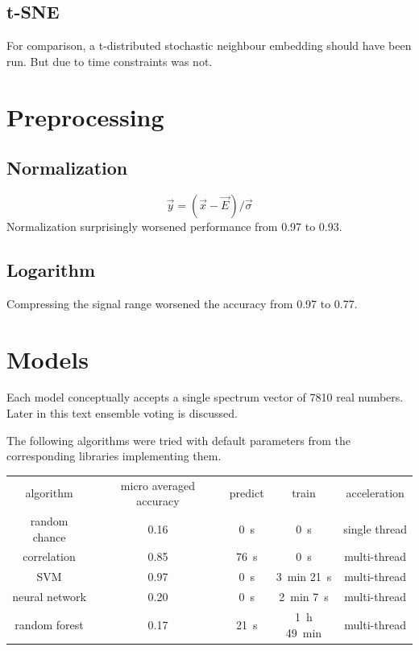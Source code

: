 \documentclass{article}
\begin{document}
\subsection{t-SNE}
For comparison, a t-distributed stochastic neighbour embedding should have been run.
But due to time constraints was not.


\section{Preprocessing}
\subsection{Normalization}
$$ \vec{y} = (\vec{x} - \vec{E}) / \vec{\sigma} $$
Normalization surprisingly worsened performance from 0.97 to 0.93.


\subsection{Logarithm}
Compressing the signal range worsened the accuracy from 0.97 to 0.77.


\section{Models}
Each model conceptually accepts a single spectrum vector of 7810 real numbers.
Later in this text ensemble voting is discussed.
\par
The following algorithms were tried with default parameters from the corresponding libraries implementing them.
\\ \par
{}
\begin{tabular}{ c | c | c | c | c }
algorithm      & micro averaged accuracy & predict          & train                            & acceleration \\
random chance  & 0.16                    & \SI{0}{\second}  & \SI{0}{\second}                  & single thread \\
correlation    & 0.85                    & \SI{76}{\second} & \SI{0}{\second}                  & multi-thread \\
SVM            & 0.97                    & \SI{0}{\second}  & \SI{3}{\minute} \SI{21}{\second} & multi-thread \\
neural network & 0.20                    & \SI{0}{\second}  & \SI{2}{\minute} \SI{7}{\second}  & multi-thread \\
random forest  & 0.17                    & \SI{21}{\second} & \SI{1}{\hour} \SI{49}{\minute}   & multi-thread \\
\end{tabular}
\end{document}
